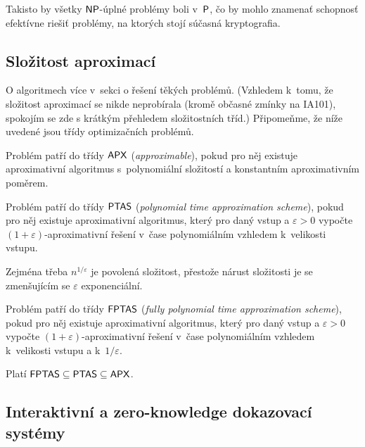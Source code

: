 Takisto by všetky $\NP$-úplné problémy boli v~$\P$, čo by mohlo znamenať
schopnosť efektívne riešiť problémy, na ktorých stojí súčasná kryptografia.

\subsection{Složitost aproximací}

O algoritmech více v~sekci o řešení těkých problémů.
(Vzhledem k~tomu, že složitost aproximací se nikde neprobírala (kromě
občasné zmínky 
na IA101), spokojím se zde s krátkým přehledem složitostních tříd.)
Připomeňme, že níže uvedené jsou třídy optimizačních problémů.

\begin{definition}
    Problém patří do třídy $\APX$ ({\em approximable}), pokud pro něj existuje
    aproximativní algoritmus s~polynomiální složitostí
    a konstantním aproximativním poměrem.
\end{definition}

\begin{definition}
    Problém patří do třídy $\PTAS$ ({\em polynomial time approximation
    scheme}), pokud pro něj existuje
    aproximativní algoritmus, který pro daný vstup a $\varepsilon > 0$
    vypočte $(1+\varepsilon)$-aproximativní řešení
    v~čase polynomiálním vzhledem k~velikosti vstupu.
\end{definition}

Zejména třeba $n^{1/\varepsilon}$ je povolená
složitost, přestože nárust složitosti je se zmenšujícím se $\varepsilon$
exponenciální.

\begin{definition}
    Problém patří do třídy $\FPTAS$ ({\em fully polynomial time approximation
    scheme}), pokud pro něj existuje
    aproximativní algoritmus, který pro daný vstup a $\varepsilon > 0$
    vypočte $(1+\varepsilon)$-aproximativní řešení
    v~čase polynomiálním vzhledem k~velikosti vstupu a k~$1/\varepsilon$.
\end{definition}

Platí $\FPTAS \subseteq \PTAS \subseteq \APX$.

\subsection{Interaktivní a zero-knowledge dokazovací systémy}

